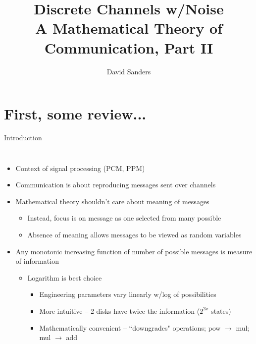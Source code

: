 \documentclass{beamer}
\title{%
  Discrete Channels w/Noise \\
  \normalsize A Mathematical Theory of Communication, Part II}
\author{David Sanders}
\begin{document}
  \maketitle

  \section{First, some review...}

  \begin{frame}{Introduction}
    \begin{columns}
      \column{\dimexpr\paperwidth-10pt}
      \begin{itemize}
        \item Context of signal processing (PCM, PPM)
        \item Communication is about reproducing messages sent over channels
        \item Mathematical theory shouldn’t care about meaning of messages
        \begin{itemize}
          \item Instead, focus is on message as one selected from many possible
          \item Absence of meaning allows messages to be viewed as random variables
        \end{itemize}
        \item Any monotonic increasing function of number of possible messages
        is measure of information
        \begin{itemize}
          \item Logarithm is best choice
          \begin{itemize}
            \item Engineering parameters vary linearly w/log of possibilities
            \item More intuitive -- 2 disks have twice the information ($2^{2x}$ states)
            \item Mathematically convenient -- ``downgrades" operations; pow
            $\rightarrow$ mul; mul $\rightarrow$ add
          \end{itemize}
        \end{itemize}
      \end{itemize}
    \end{columns}
  \end{frame}
\end{document}
